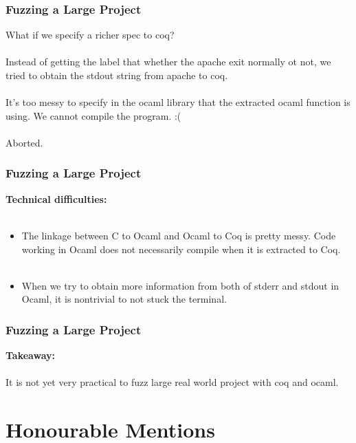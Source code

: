 \documentclass{beamer}
\begin{document}
\begin{frame}
\frametitle{Fuzzing a Large Project}
    What if we specify a richer spec to coq? \\~\\
    \pause{}
    Instead of getting the label that whether the apache exit normally ot not, we tried to obtain the stdout string from apache to coq. \\~\\
    \pause{}
    It's too messy to specify in the ocaml library that the extracted ocaml function is using. We cannot compile the program. :(  \\~\\
    \pause{}
    Aborted.
\end{frame}
\begin{frame}
\frametitle{Fuzzing a Large Project}

\textbf{Technical difficulties:} \\~\\

\begin{itemize}
    \item The linkage between C to Ocaml and Ocaml to Coq is pretty messy. Code working in Ocaml does not necessarily compile when it is extracted to Coq. \\~\\
    \item When we try to obtain more information from both of stderr and stdout in Ocaml, it is nontrivial to not stuck the terminal.
\end{itemize}

\end{frame}

\begin{frame}
\frametitle{Fuzzing a Large Project}

\textbf{Takeaway:} \\~\\
It is not yet very practical to fuzz large real world project with coq and ocaml.

    
\end{frame}
\section{Honourable Mentions}
\end{document}
